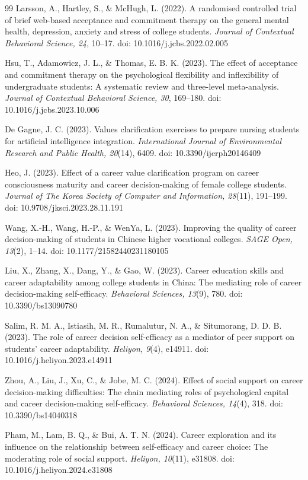 \documentclass[10pt]{NSP1}
\begin{document}
\begin{thebibliography}{99}
 Larsson, A., Hartley, S., \& McHugh, L. (2022). A randomised controlled trial of brief web-based acceptance and commitment therapy on the general mental health, depression, anxiety and stress of college students. \emph{Journal of Contextual Behavioral Science, 24}, 10--17. doi: 10.1016/j.jcbs.2022.02.005

 Hsu, T., Adamowicz, J. L., \& Thomas, E. B. K. (2023). The effect of acceptance and commitment therapy on the psychological flexibility and inflexibility of undergraduate students: A systematic review and three-level meta-analysis. \emph{Journal of Contextual Behavioral Science, 30}, 169--180. doi: 10.1016/j.jcbs.2023.10.006

 De Gagne, J. C. (2023). Values clarification exercises to prepare nursing students for artificial intelligence integration. \emph{International Journal of Environmental Research and Public Health, 20}(14), 6409. doi: 10.3390/ijerph20146409

 Heo, J. (2023). Effect of a career value clarification program on career consciousness maturity and career decision-making of female college students. \emph{Journal of The Korea Society of Computer and Information, 28}(11), 191--199. doi: 10.9708/jksci.2023.28.11.191

 Wang, X.-H., Wang, H.-P., \& WenYa, L. (2023). Improving the quality of career decision-making of students in Chinese higher vocational colleges. \emph{SAGE Open, 13}(2), 1--14. doi: 10.1177/21582440231180105

 Liu, X., Zhang, X., Dang, Y., \& Gao, W. (2023). Career education skills and career adaptability among college students in China: The mediating role of career decision-making self-efficacy. \emph{Behavioral Sciences, 13}(9), 780. doi: 10.3390/bs13090780

 Salim, R. M. A., Istiasih, M. R., Rumalutur, N. A., \& Situmorang, D. D. B. (2023). The role of career decision self-efficacy as a mediator of peer support on students' career adaptability. \emph{Heliyon, 9}(4), e14911. doi: 10.1016/j.heliyon.2023.e14911

 Zhou, A., Liu, J., Xu, C., \& Jobe, M. C. (2024). Effect of social support on career decision-making difficulties: The chain mediating roles of psychological capital and career decision-making self-efficacy. \emph{Behavioral Sciences, 14}(4), 318. doi: 10.3390/bs14040318

 Pham, M., Lam, B. Q., \& Bui, A. T. N. (2024). Career exploration and its influence on the relationship between self-efficacy and career choice: The moderating role of social support. \emph{Heliyon, 10}(11), e31808. doi: 10.1016/j.heliyon.2024.e31808


\end{thebibliography}
\end{document}
